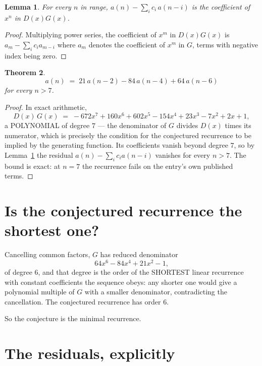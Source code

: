 \documentclass[11pt,a4paper]{article}
\theoremstyle{plain}
\newtheorem{theorem}{Theorem}
\newtheorem{lemma}[theorem]{Lemma}
\theoremstyle{definition}
\begin{document}
\begin{lemma}\label{lem:key}
For every $n$ in range, $a(n)-\sum_i c_i\,a(n-i)$ is the coefficient of $x^{n}$ in
$D(x)G(x)$.
\end{lemma}

\begin{proof}
Multiplying power series, the coefficient of $x^{m}$ in $D(x)G(x)$ is
$a_m-\sum_i c_i a_{m-i}$ where $a_m$ denotes the coefficient of $x^{m}$ in $G$, terms with
negative index being zero.
\end{proof}

\begin{theorem}
\[
a(n)\;=\;21\,a(n-2) - 84\,a(n-4) + 64\,a(n-6)
\]
for every $n>7$.
\end{theorem}

\begin{proof}
In exact arithmetic,
\[
D(x)\,G(x)\;=\;- 672 x^{7} + 160 x^{6} + 602 x^{5} - 154 x^{4} + 23 x^{3} - 7 x^{2} + 2 x + 1,
\]
a POLYNOMIAL of degree $7$ --- the denominator of $G$ divides $D(x)$ times its numerator,
which is precisely the condition for the conjectured recurrence to be implied by the
generating function. Its coefficients vanish beyond degree $7$, so by
Lemma~\ref{lem:key} the residual $a(n)-\sum_ic_ia(n-i)$ vanishes for every
$n>7$. The bound is exact: at $n=7$ the recurrence fails on the entry's own published terms.
\end{proof}

\section{Is the conjectured recurrence the shortest one?}

Cancelling common factors, $G$ has reduced denominator
\[
64 x^{6} - 84 x^{4} + 21 x^{2} - 1,
\]
of degree $6$, and that degree is the order of the SHORTEST linear recurrence with
constant coefficients the sequence obeys: any shorter one would give a polynomial multiple of
$G$ with a smaller denominator, contradicting the cancellation. The conjectured recurrence has
order $6$.

So the conjecture is the minimal recurrence.

\section{The residuals, explicitly}
\end{document}
